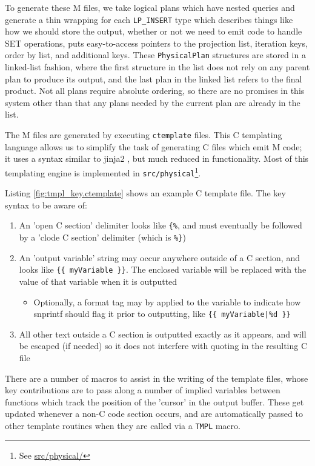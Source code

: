 \documentclass[]{article}
\def\code#1{\texttt{#1}}
\newcommand{\gitlab}[1]{\footnote{See \href{https://gitlab.com/YottaDB/DBMS/YDBOcto/blob/master/#1}{#1}}}
\begin{document}
To generate these M files, we take logical plans which have nested queries and generate a thin wrapping for each \code{LP\_INSERT} type which describes things like how we should store the output, whether or not we need to emit code to handle SET operations, puts easy-to-access pointers to the projection list, iteration keys, order by list, and additional keys.
These \code{PhysicalPlan} structures are stored in a linked-list fashion, where the first structure in the list does not rely on any parent plan to produce its output, and the last plan in the linked list refers to the final product.
Not all plans require absolute ordering, so there are no promises in this system other than that any plans needed by the current plan are already in the list.

The M files are generated by executing \code{ctemplate} files.
This C templating language allows us to simplify the task of generating C files which emit M code; it uses a syntax similar to jinja2 \cite{jinja2}, but much reduced in functionality.
Most of this templating engine is implemented in \code{src/physical}\gitlab{src/physical/}.

Listing \ref{fig:tmpl_key.ctemplate} shows an example C template file.
The key syntax to be aware of:

\begin{enumerate}
	\item An 'open C section' delimiter looks like \code{\{\%}, and must eventually be followed by a 'clode C section' delimiter (which is \code{\%\}})
	\item An 'output variable' string may occur anywhere outside of a C section, and looks like \code{\{\{ myVariable \}\}}. The enclosed variable will be replaced with the value of that variable when it is outputted
	\begin{itemize}
		\item Optionally, a format tag may by applied to the variable to indicate how snprintf should flag it prior to outputting, like \code{\{\{ myVariable|\%d \}\}}
	\end{itemize}
	\item All other text outside a C section is outputted exactly as it appears, and will be escaped (if needed) so it does not interfere with quoting in the resulting C file
\end{enumerate}

There are a number of macros to assist in the writing of the template files, whose key contributions are to pass along a number of implied variables between functions which track the position of the 'cursor' in the output buffer.
These get updated whenever a non-C code section occurs, and are automatically passed to other template routines when they are called via a \code{TMPL} macro.
\end{document}

